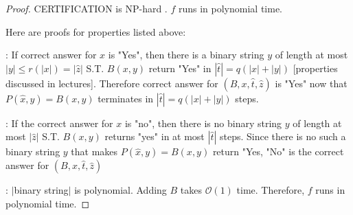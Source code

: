 \documentclass[openany]{article}
\begin{document}
\begin{proof}{CERTIFICATION is NP-hard}
. $f$ runs in polynomial time.

Here are proofs for properties listed above:

: If correct answer for $x$ is "Yes", then there is a binary string $y$ of length at most $|y| \leqslant r(|x|) = |\hat{z}|$ S.T. $B(x,y)$ return "Yes" in $|\hat{t}| = q(|x|+|y|)$ [properties discussed in lectures]. Therefore correct answer for $(B, x, \hat{t}, \hat{z})$ is "Yes" now that $P(\hat{x},y) = B(x,y)$ terminates in $|\hat{t}| = q(|x|+|y|)$ steps.

: If the correct answer for $x$ is "no", then there is no binary string $y$ of length at most $|\hat{z}|$ S.T. $B(x,y)$ returns "yes" in at most $|\hat{t}|$ steps. Since there is no such a binary string $y$ that makes $P(\hat{x},y) = B(x,y)$ return "Yes, "No" is the correct answer for $(B,x,\hat{t},\hat{z})$


: $|$binary string$|$ is polynomial. Adding $B$ takes $\mathcal{O}(1)$ time. Therefore, $f$ runs in polynomial time.








    
\end{proof}
\end{document}
